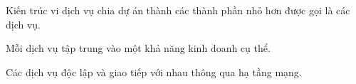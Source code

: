 Kiến trúc vi dịch vụ chia dự án thành các thành phần nhỏ hơn được gọi là các dịch vụ.

Mỗi dịch vụ tập trung vào một khả năng kinh doanh cụ thể. 

Các dịch vụ   độc lập và  giao tiếp với nhau thông qua  hạ tầng mạng.


% 


  


















